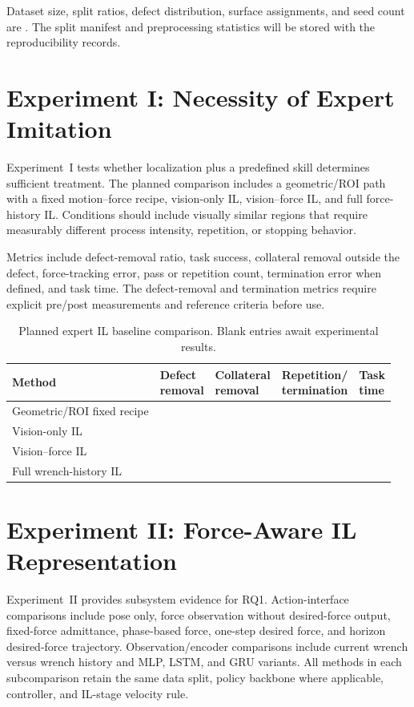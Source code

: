Dataset size, split ratios, defect distribution, surface assignments, and seed count are . The split manifest and preprocessing statistics will be stored with the reproducibility records.

\section{Experiment I: Necessity of Expert Imitation}
Experiment~I tests whether localization plus a predefined skill determines sufficient treatment. The planned comparison includes a geometric/ROI path with a fixed motion--force recipe, vision-only IL, vision--force IL, and full force-history IL. Conditions should include visually similar regions that require measurably different process intensity, repetition, or stopping behavior.

Metrics include defect-removal ratio, task success, collateral removal outside the defect, force-tracking error, pass or repetition count, termination error when defined, and task time. The defect-removal and termination metrics require explicit pre/post measurements and reference criteria before use.

\begin{table}[t]
\centering
\caption{Planned expert IL baseline comparison. Blank entries await experimental results.}
\label{tab:expert_il_baselines}
\small
\begin{tabularx}{\textwidth}{p{}XXXX}
\toprule
Method & \makecell{Defect\\removal} & \makecell{Collateral\\removal} & \makecell{Repetition/\\termination} & \makecell{Task\\time} \\
\midrule
Geometric/ROI fixed recipe & & & & \\
Vision-only IL & & & & \\
Vision--force IL & & & & \\
Full wrench-history IL & & & & \\
\bottomrule
\end{tabularx}
\end{table}

\section{Experiment II: Force-Aware IL Representation}
Experiment~II provides subsystem evidence for RQ1. Action-interface comparisons include pose only, force observation without desired-force output, fixed-force admittance, phase-based force, one-step desired force, and horizon desired-force trajectory. Observation/encoder comparisons include current wrench versus wrench history and MLP, LSTM, and GRU variants. All methods in each subcomparison retain the same data split, policy backbone where applicable, controller, and IL-stage velocity rule.

